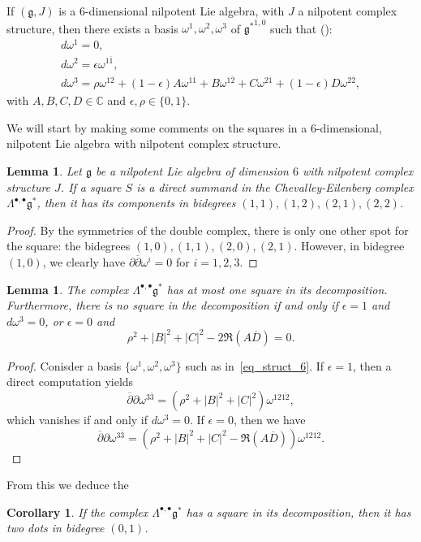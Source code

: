 \documentclass[leqno]{article}
\newtheorem{Corollary}[equation]{Corollary}
\newtheorem{Lemma}[equation]{Lemma}
\theoremstyle{definition}
\numberwithin{equation}{section}
\begin{document}
If $(\mathfrak{g}, J)$ is a $6$-dimensional nilpotent Lie algebra, with $J$ a nilpotent complex structure, then there exists a basis $\omega^1, \omega^2, \omega^3$ of ${\mathfrak{g}^*}^{1, 0}$ such that (\cite{Uga}):
\begin{equation}
\label{eq_struct_6}
\begin{array}{ccc}
d\omega^1 = 0, \\
d\omega^2 = \epsilon \omega^{1\overline{1}}, \\
d\omega^3 = \rho \omega^{12} + (1-\epsilon)A\omega^{1\overline{1}} + B\omega^{1\overline{2}} + C\omega^{2\overline{1}} + (1-\epsilon)D\omega^{2\overline{2}},
\end{array}
\end{equation}
with $A, B, C, D \in \mathbb{C}$ and $\epsilon, \rho \in \{0, 1\}$.

We will start by making some comments on the squares in a $6$-dimensional, nilpotent Lie algebra with nilpotent complex structure.
\begin{Lemma}
Let $\mathfrak{g}$ be a nilpotent Lie algebra of dimension $6$ with nilpotent complex structure $J$. If a square $S$ is a direct summand in the Chevalley-Eilenberg complex $\Lambda^{\bullet, \bullet} \mathfrak{g}^*$, then it has its components in bidegrees $(1, 1), (1, 2), (2, 1), (2, 2)$.
\end{Lemma}
\begin{proof}
By the symmetries of the double complex, there is only one other spot for the square: the bidegrees $(1, 0), (1, 1), (2, 0), (2, 1)$. However, in bidegree $(1, 0)$, we clearly have $\partial \overline{\partial} \omega^i = 0$ for $i = 1, 2, 3$. 
\end{proof}
\begin{Lemma}
The complex $\Lambda^{\bullet, \bullet}\mathfrak{g}^*$ has at most one square in its decomposition. Furthermore, there is no square in the decomposition if and only if $\epsilon = 1$ and $d\omega^3=0$, or $\epsilon = 0$ and
\begin{equation}
\label{no-square}
\rho^2+|B|^2+|C|^2-2\Re (A\overline{D})
=
0.
\end{equation}
\end{Lemma}
\begin{proof}
Conisder a basis $\{ \omega^1, \omega^2, \omega^3 \}$ such as in~\ref{eq_struct_6}. If $\epsilon = 1$, then a direct computation yields
\[
\overline{\partial}\partial \omega^{3\overline{3}}
=
(\rho^2 + |B|^2 + |C|^2) \omega^{12\overline{12}},
\]
which vanishes if and only if $d\omega^3 = 0$. If $\epsilon = 0$, then we have
\[
\overline{\partial}\partial \omega^{3\overline{3}}
=
(\rho^2 + |B|^2 + |C|^2 - \Re(A\overline{D})) \omega^{12\overline{12}}.
\]
\end{proof}
From this we deduce the
\begin{Corollary}
If the complex $\Lambda^{\bullet, \bullet}\mathfrak{g}^*$ has a square in its decomposition, then it has two dots in bidegree $(0, 1)$.
\end{Corollary}
\end{document}
